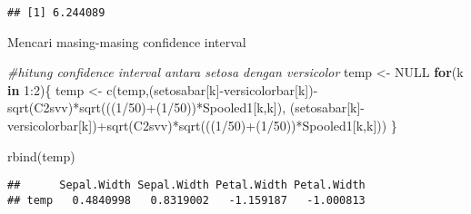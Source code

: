 \documentclass[
]{article}
\newenvironment{Shaded}{\begin{snugshade}}{\end{snugshade}}
\newcommand{\CommentTok}[1]{\textcolor[rgb]{0.56,0.35,0.01}{\textit{#1}}}
\newcommand{\ConstantTok}[1]{\textcolor[rgb]{0.00,0.00,0.00}{#1}}
\newcommand{\ControlFlowTok}[1]{\textcolor[rgb]{0.13,0.29,0.53}{\textbf{#1}}}
\newcommand{\DecValTok}[1]{\textcolor[rgb]{0.00,0.00,0.81}{#1}}
\newcommand{\FunctionTok}[1]{\textcolor[rgb]{0.00,0.00,0.00}{#1}}
\newcommand{\NormalTok}[1]{#1}
\newcommand{\OtherTok}[1]{\textcolor[rgb]{0.56,0.35,0.01}{#1}}
\newcommand{\SpecialCharTok}[1]{\textcolor[rgb]{0.00,0.00,0.00}{#1}}
\begin{document}
\begin{verbatim}
## [1] 6.244089
\end{verbatim}

Mencari masing-masing confidence interval

\begin{Shaded}
\begin{Highlighting}[]
\CommentTok{\#hitung confidence interval antara setosa dengan versicolor}
\NormalTok{temp }\OtherTok{\textless{}{-}} \ConstantTok{NULL}
\ControlFlowTok{for}\NormalTok{(k }\ControlFlowTok{in} \DecValTok{1}\SpecialCharTok{:}\DecValTok{2}\NormalTok{)\{}
\NormalTok{    temp }\OtherTok{\textless{}{-}} \FunctionTok{c}\NormalTok{(temp,(setosabar[k]}\SpecialCharTok{{-}}\NormalTok{versicolorbar[k])}\SpecialCharTok{{-}}\FunctionTok{sqrt}\NormalTok{(C2svv)}\SpecialCharTok{*}\FunctionTok{sqrt}\NormalTok{(((}\DecValTok{1}\SpecialCharTok{/}\DecValTok{50}\NormalTok{)}\SpecialCharTok{+}\NormalTok{(}\DecValTok{1}\SpecialCharTok{/}\DecValTok{50}\NormalTok{))}\SpecialCharTok{*}\NormalTok{Spooled1[k,k]),}
\NormalTok{          (setosabar[k]}\SpecialCharTok{{-}}\NormalTok{versicolorbar[k])}\SpecialCharTok{+}\FunctionTok{sqrt}\NormalTok{(C2svv)}\SpecialCharTok{*}\FunctionTok{sqrt}\NormalTok{(((}\DecValTok{1}\SpecialCharTok{/}\DecValTok{50}\NormalTok{)}\SpecialCharTok{+}\NormalTok{(}\DecValTok{1}\SpecialCharTok{/}\DecValTok{50}\NormalTok{))}\SpecialCharTok{*}\NormalTok{Spooled1[k,k]))}
\NormalTok{\}}

\FunctionTok{rbind}\NormalTok{(temp)}
\end{Highlighting}
\end{Shaded}

\begin{verbatim}
##      Sepal.Width Sepal.Width Petal.Width Petal.Width
## temp   0.4840998   0.8319002   -1.159187   -1.000813
\end{verbatim}
\end{document}
